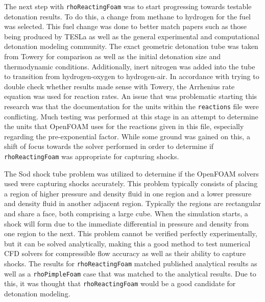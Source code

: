 The next step with \verb|rhoReactingFoam| was to start progressing towards testable detonation results. To do this, a change from methane to hydrogen for the fuel was selected. This fuel change was done to better match papers such as those being produced by TESLa as well as the general experimental and computational detonation modeling community. The exact geometric detonation tube was taken from Towery\cite{towery1} for comparison as well as the initial detonation size and thermodynamic conditions. Additionally, inert nitrogen was added into the tube to transition from hydrogen-oxygen to hydrogen-air. In accordance with trying to double check whether results made sense with Towery\cite{towery1}, the Arrhenius rate equation \cite{arrhenius} was used for reaction rates. An issue that was problematic starting this research was that the documentation for the units within the \verb|reactions| file were conflicting. Much testing was performed at this stage in an attempt to determine the units that OpenFOAM uses for the reactions given in this file, especially regarding the pre-exponential factor. While some ground was gained on this, a shift of focus towards the solver performed in order to determine if \verb|rhoReactingFoam| was appropriate for capturing shocks. 

The Sod shock tube problem was utilized to determine if the OpenFOAM solvers used were capturing shocks accurately. This problem typically consists of placing a region of higher pressure and density fluid in one region and a lower pressure and density fluid in another adjacent region. Typically the regions are rectangular and share a face, both comprising a large cube. When the simulation starts, a shock will form due to the immediate differential in pressure and density from one region to the next. This problem cannot be verified perfectly experimentally, but it can be solved analytically, making this a good method to test numerical CFD solvers for compressible flow accuracy as well as their ability to capture shocks. The results for \verb|rhoReactingFoam| matched published analytical results as well as a \verb|rhoPimpleFoam| case that was matched to the analytical results. Due to this, it was thought that \verb|rhoReactingFoam| would be a good candidate for detonation modeling. 

